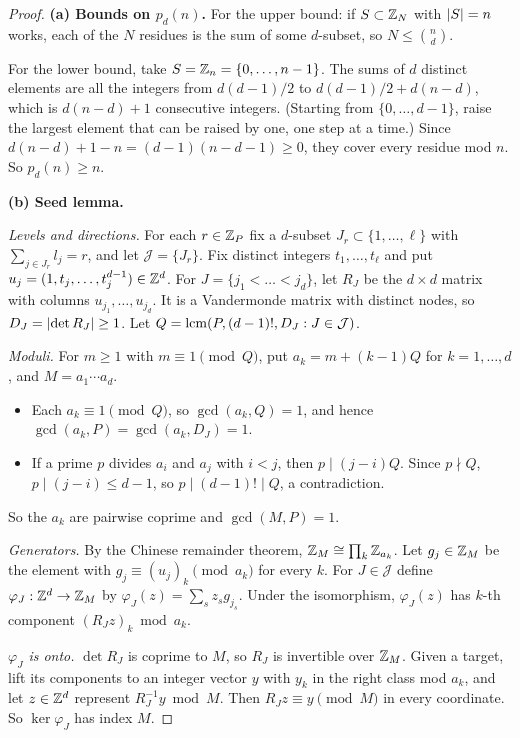 \documentclass[11pt]{article}
\begin{document}
\begin{proof}
\textbf{(a) Bounds on $p_d(n)$.} For the upper bound: if $S \subset \mathbb{Z}_N$ with $\left|S\right| = n$
works, each of the $N$ residues is the sum of some $d$-subset, so $N \le \binom{n}{d}$.

For the lower bound, take $S = \mathbb{Z}_n = \{0, \dots, n-1\}$. The sums of $d$ distinct elements are
all the integers from $d(d-1)/2$ to $d(d-1)/2 + d(n-d)$, which is $d(n-d) + 1$ consecutive
integers. (Starting from $\{0, \dots, d-1\}$, raise the largest element that can be raised by one,
one step at a time.) Since $d(n-d) + 1 - n = (d-1)(n-d-1) \ge 0$, they cover every residue mod
$n$. So $p_d(n) \ge n$.

\medskip
\textbf{(b) Seed lemma.}

\emph{Levels and directions.} For each $r \in \mathbb{Z}_P$ fix a $d$-subset $J_r \subset \{1, \dots, \ell\}$
with $\sum_{j \in J_r} l_j = r$, and let $\mathcal{J} = \{J_r\}$. Fix distinct integers
$t_1, \dots, t_\ell$ and put $u_j = (1, t_j, \dots, t_j^{d-1}) \in \mathbb{Z}^d$. For
$J = \{j_1 < \dots < j_d\}$, let $R_J$ be the $d \times d$ matrix with columns
$u_{j_1}, \dots, u_{j_d}$. It is a Vandermonde matrix with distinct nodes, so
$D_J = \left|\det R_J\right| \ge 1$. Let $Q = \operatorname{lcm}(P, (d-1)!, D_J : J \in \mathcal{J})$.

\emph{Moduli.} For $m \ge 1$ with $m \equiv 1 \pmod{Q}$, put $a_k = m + (k-1)Q$ for
$k = 1, \dots, d$, and $M = a_1 \cdots a_d$.
\begin{itemize}
  \item Each $a_k \equiv 1 \pmod{Q}$, so $\gcd(a_k, Q) = 1$, and hence
    $\gcd(a_k, P) = \gcd(a_k, D_J) = 1$.
  \item If a prime $p$ divides $a_i$ and $a_j$ with $i < j$, then $p \mid (j-i)Q$. Since
    $p \nmid Q$, $p \mid (j-i) \le d-1$, so $p \mid (d-1)! \mid Q$, a contradiction.
\end{itemize}
So the $a_k$ are pairwise coprime and $\gcd(M, P) = 1$.

\emph{Generators.} By the Chinese remainder theorem, $\mathbb{Z}_M \cong \prod_k \mathbb{Z}_{a_k}$. Let
$g_j \in \mathbb{Z}_M$ be the element with $g_j \equiv (u_j)_k \pmod{a_k}$ for every $k$. For
$J \in \mathcal{J}$ define $\varphi_J : \mathbb{Z}^d \to \mathbb{Z}_M$ by $\varphi_J(z) = \sum_s z_s g_{j_s}$.
Under the isomorphism, $\varphi_J(z)$ has $k$-th component $(R_J z)_k \bmod a_k$.

\emph{$\varphi_J$ is onto.} $\det R_J$ is coprime to $M$, so $R_J$ is invertible over $\mathbb{Z}_M$.
Given a target, lift its components to an integer vector $y$ with $y_k$ in the right class mod
$a_k$, and let $z \in \mathbb{Z}^d$ represent $R_J^{-1} y \bmod M$. Then $R_J z \equiv y \pmod{M}$ in every
coordinate. So $\ker \varphi_J$ has index $M$.


\end{proof}
\end{document}

